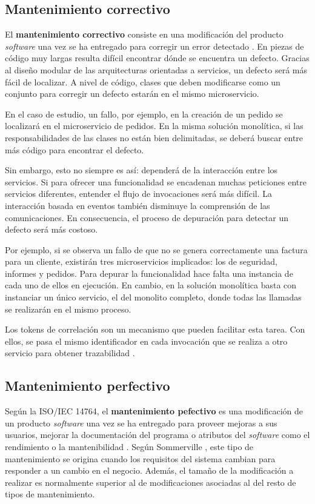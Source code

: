 \documentclass[11pt,spanish,listoffigures]{tfgetsinf}
\begin{document}
\subsection{Mantenimiento correctivo}

El \textbf{mantenimiento correctivo} consiste en una modificación del producto \textit{software} una vez se ha entregado para corregir un error detectado \cite{Bourque2014}. En piezas de código muy largas resulta difícil encontrar dónde se encuentra un defecto. Gracias al diseño modular de las arquitecturas orientadas a servicios, un defecto será más fácil de localizar. A nivel de código, clases que deben modificarse como un conjunto para corregir un defecto estarán en el mismo microservicio.

En el caso de estudio, un fallo, por ejemplo, en la creación de un pedido se localizará en el microservicio de pedidos. En la misma solución monolítica, si las responsabilidades de las clases no están bien delimitadas, se deberá buscar entre más código para encontrar el defecto.

Sin embargo, esto no siempre es así: dependerá de la interacción entre los servicios. Si para ofrecer una funcionalidad se encadenan muchas peticiones entre servicios diferentes, entender el flujo de invocaciones será más difícil. La interacción basada en eventos también disminuye la comprensión de las comunicaciones. En consecuencia, el proceso de depuración para detectar un defecto será más costoso. 

Por ejemplo, si se observa un fallo de que no se genera correctamente una factura para un cliente, existirán tres microservicios implicados: los de seguridad, informes y pedidos. Para depurar la funcionalidad hace falta una instancia de cada uno de ellos en ejecución. En cambio, en la solución monolítica basta con instanciar un único servicio, el del monolito completo, donde todas las llamadas se realizarán en el mismo proceso.

Los tokens de correlación son un mecanismo que pueden facilitar esta tarea. Con ellos, se pasa el mismo identificador en cada invocación que se realiza a otro servicio para obtener trazabilidad \cite{Baum2016}.

\subsection{Mantenimiento perfectivo}


Según la ISO/IEC 14764, el \textbf{mantenimiento pefectivo} es una modificación de un producto \textit{software} una vez se ha entregado para proveer mejoras a sus usuarios, mejorar la documentación del programa o atributos del \textit{software} como el rendimiento o la mantenibilidad \cite{Bourque2014}. Según Sommerville \cite{Sommerville2010}, este tipo de mantenimiento se origina cuando los requisitos del sistema cambian para responder a un cambio en el negocio. Además, el tamaño de la modificación a realizar es normalmente superior al de modificaciones asociadas al del resto de tipos de mantenimiento.
\end{document}
